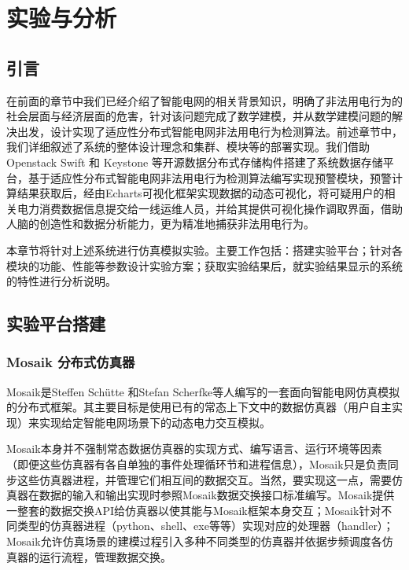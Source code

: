 ﻿%

\raggedbottom
\chapter{实验与分析}
\label{chap:evaluation}

\section{引言}

在前面的章节中我们已经介绍了智能电网的相关背景知识，明确了非法用电行为的社会层面与经济层面的危害，针对该问题完成了数学建模，并从数学建模问题的解决出发，设计实现了适应性分布式智能电网非法用电行为检测算法。前述章节中，我们详细叙述了系统的整体设计理念和集群、模块等的部署实现。我们借助Openstack Swift 和 Keystone 等开源数据分布式存储构件搭建了系统数据存储平台，基于适应性分布式智能电网非法用电行为检测算法编写实现预警模块，预警计算结果获取后，经由Echarts可视化框架实现数据的动态可视化，将可疑用户的相关电力消费数据信息提交给一线运维人员，并给其提供可视化操作调取界面，借助人脑的创造性和数据分析能力，更为精准地捕获非法用电行为。

本章节将针对上述系统进行仿真模拟实验。主要工作包括：搭建实验平台；针对各模块的功能、性能等参数设计实验方案；获取实验结果后，就实验结果显示的系统的特性进行分析说明。

\section{实验平台搭建}

\subsection{Mosaik 分布式仿真器}

Mosaik是Steffen Schütte 和Stefan Scherfke等人编写的一套面向智能电网仿真模拟的分布式框架。其主要目标是使用已有的常态上下文中的数据仿真器（用户自主实现）来实现给定智能电网场景下的动态电力交互模拟。

Mosaik本身并不强制常态数据仿真器的实现方式、编写语言、运行环境等因素（即便这些仿真器有各自单独的事件处理循环节和进程信息），Mosaik只是负责同步这些仿真器进程，并管理它们相互间的数据交互。当然，要实现这一点，需要仿真器在数据的输入和输出实现时参照Mosaik数据交换接口标准编写。Mosaik提供一整套的数据交换API给仿真器以使其能与Mosaik框架本身交互；Mosaik针对不同类型的仿真器进程（python、shell、exe等等）实现对应的处理器（handler）；Mosaik允许仿真场景的建模过程引入多种不同类型的仿真器并依据步频调度各仿真器的运行流程，管理数据交换。

